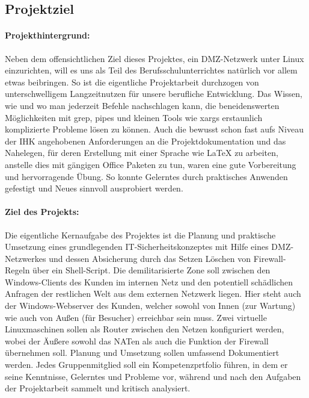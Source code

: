 \subsection{Projektziel} 
\label{sec:Projektziel}
\paragraph*{Projekthintergrund: } Neben dem offensichtlichen Ziel dieses Projektes, ein DMZ-Netzwerk unter Linux einzurichten, will es uns als Teil des Berufsschulunterrichtes natürlich vor allem etwas beibringen. So ist die eigentliche Projektarbeit durchzogen von unterschwelligem Langzeitnutzen für unsere berufliche Entwicklung. Das Wissen, wie und wo man jederzeit Befehle nachschlagen kann, die beneidenswerten Möglichkeiten mit grep, pipes und kleinen Tools wie xargs erstaunlich komplizierte Probleme lösen zu können. Auch die bewusst schon fast aufs Niveau der IHK angehobenen Anforderungen an die Projektdokumentation und das Nahelegen, für deren Erstellung mit einer Sprache wie \LaTeX{} zu arbeiten, anstelle dies mit gängigen Office Paketen zu tun, waren eine gute Vorbereitung und hervorragende Übung. So konnte Gelerntes durch praktisches Anwenden gefestigt und Neues sinnvoll ausprobiert werden.
    
\paragraph*{Ziel des Projekts: } Die eigentliche Kernaufgabe des Projektes ist die Planung und praktische Umsetzung eines grundlegenden IT-Sicherheitskonzeptes mit Hilfe eines DMZ-Netzwerkes und dessen Absicherung durch das Setzen \bzw Löschen von Firewall-Regeln über ein Shell-Script. Die demilitarisierte Zone soll zwischen den Windows-Clients des Kunden im internen Netz und den potentiell schädlichen Anfragen der restlichen Welt aus dem externen Netzwerk liegen. Hier steht auch der Windows-Webserver des Kunden, welcher sowohl von Innen (zur Wartung) wie auch von Außen (für Besucher) erreichbar sein muss. Zwei virtuelle Linuxmaschinen sollen als Router zwischen den Netzen konfiguriert werden, wobei der Äußere sowohl das NATen als auch die Funktion der Firewall übernehmen soll. Planung und Umsetzung sollen umfassend Dokumentiert werden. Jedes Gruppenmitglied soll ein Kompetenzprtfolio führen, in dem er seine Kenntnisse, Gelerntes und Probleme vor, während und nach den Aufgaben der Projektarbeit sammelt und kritisch analysiert.

